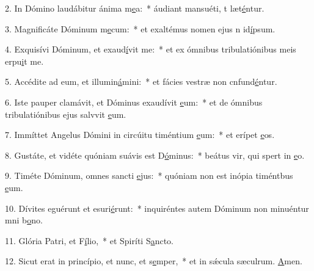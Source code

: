 2. In Dómino laudábitur ánima m\uline{e}a:~* áudiant mansuéti, t læt\uline{é}ntur.\par 
3. Magnificáte Dóminum m\uline{e}cum:~* et exaltémus nomen ejus n id\uline{í}psum.\par 
4. Exquisívi Dóminum, et exaud\uline{í}vit me:~* et ex ómnibus tribulatiónibus meis erpu\uline{i}t me.\par 
5. Accédite ad eum, et illumin\uline{á}mini:~* et fácies vestræ non cnfund\uline{é}ntur.\par 
6. Iste pauper clamávit, et Dóminus exaudívit \uline{e}um:~* et de ómnibus tribulatiónibus ejus salvvit \uline{e}um.\par 
7. Immíttet Angelus Dómini in circúitu timéntium \uline{e}um:~* et erípet \uline{e}os.\par 
8. Gustáte, et vidéte quóniam suávis est D\uline{ó}minus:~* beátus vir, qui spert in \uline{e}o.\par 
9. Timéte Dóminum, omnes sancti \uline{e}jus:~* quóniam non est inópia timéntbus \uline{e}um.\par 
10. Dívites eguérunt et esuri\uline{é}runt:~* inquiréntes autem Dóminum non minuéntur mni b\uline{o}no.\par 
11. Glória Patri, et F\uline{í}lio,~* et Spiríti S\uline{a}ncto.\par 
12. Sicut erat in princípio, et nunc, et s\uline{e}mper,~* et in sǽcula sæculrum. \uline{A}men.\par 
